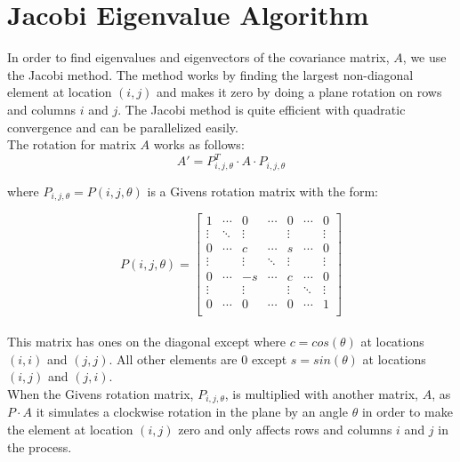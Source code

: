 \documentclass[12pt,twoside]{article}
\begin{document}
\section{Jacobi Eigenvalue Algorithm}

In order to find eigenvalues and eigenvectors of the covariance matrix, $A$, we use the Jacobi method. The method works by finding the largest non-diagonal element at location $(i,j)$ and makes it zero by doing a plane rotation on rows and columns $i$ and $j$. The Jacobi method is quite efficient with quadratic convergence and can be parallelized easily.  \\


The rotation for matrix $A$ works as follows:
\begin{equation}
     A' = P_{i,j,\theta}^T \cdot A \cdot P_{i,j,\theta}  
\end{equation}

where $P_{i,j,\theta} = P(i,j,\theta)$ is a Givens rotation matrix with the form:

\begin{equation}
P(i,j,\theta) = 
\begin{bmatrix}
     1 & \cdots & 0 & \cdots & 0 & \cdots & 0 \\
     \vdots & \ddots & \vdots &   & \vdots &  & \vdots \\
          0 & \cdots & c & \cdots & s & \cdots & 0 \\
         \vdots &  & \vdots & \ddots  & \vdots &  & \vdots \\
     0 & \cdots & -s & \cdots & c & \cdots & 0 \\
              \vdots &  & \vdots &  & \vdots & \ddots  & \vdots \\
                   0 & \cdots & 0 & \cdots & 0 & \cdots & 1 \\
\end{bmatrix}
\end{equation}\\

This matrix has ones on the diagonal except where $c=cos(\theta)$ at locations $(i,i)$ and $(j,j)$. All other elements are 0 except $s=sin(\theta)$ at locations $(i,j)$ and $(j,i)$.\\

When the Givens rotation matrix, $P_{i,j,\theta}$,  is multiplied with another matrix, $A$, as $P\cdot A$ it simulates a clockwise rotation in the plane by an angle $\theta$ in order to make the element at location $(i,j)$ zero and only affects rows and columns $i$ and $j$ in the process.\\
 
\end{document}
